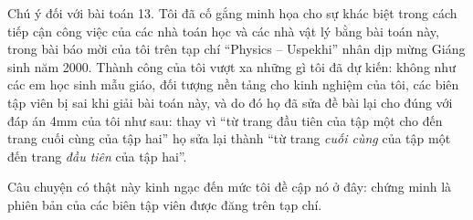 \vfill
\noindent\begin{minipage}{\linewidth}
\begin{note}{Chú ý đối với bài toán 13.}
	Tôi đã cố gắng minh họa cho sự khác biệt trong cách tiếp cận công việc của các nhà toán học và các nhà vật lý bằng bài toán này, trong bài báo mời của tôi trên tạp chí \enquote{Physics -- Uspekhi} nhân dịp mừng Giáng sinh năm 2000. Thành công của tôi vượt xa những gì tôi đã dự kiến: không như các em học sinh mẫu giáo, đối tượng nền tảng cho kinh nghiệm của tôi, các biên tập viên bị sai khi giải bài toán này, và do đó họ đã sửa đề bài lại cho đúng với đáp án 4mm của tôi như sau: thay vì \enquote{từ trang đầu tiên của tập một cho đến trang cuối cùng của tập hai} họ sửa lại thành \enquote{từ trang \emph{cuối cùng} của tập một đến trang \emph{đầu tiên} của tập hai}.

	Câu chuyện có thật này kinh ngạc đến mức tôi đề cập nó ở đây: chứng minh là phiên bản của các biên tập viên được đăng trên tạp chí.
\end{note}
\end{minipage}
\clearpage

